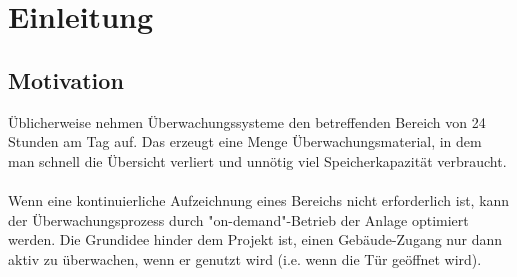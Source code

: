 \chapter{Einleitung}

\section{Motivation}
\"Ublicherweise nehmen \"Uberwachungssysteme den betreffenden Bereich von 24 Stunden am Tag auf. Das erzeugt eine Menge \"Uberwachungsmaterial, in dem man schnell die \"Ubersicht verliert und unn\"otig viel Speicherkapazit\"at verbraucht.\\
\\
Wenn eine kontinuierliche Aufzeichnung eines Bereichs nicht erforderlich ist, kann der \"Uberwachungsprozess durch "on-demand"-Betrieb der Anlage optimiert werden. 
Die Grundidee hinder dem Projekt ist, einen Geb\"aude-Zugang nur dann aktiv zu \"uberwachen, wenn er genutzt wird (i.e. wenn die T\"ur ge\"offnet wird).
\\

